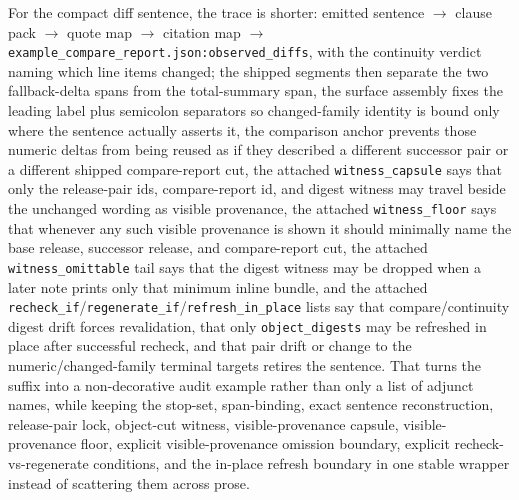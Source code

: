 \documentclass[11pt]{article}
\begin{document}
For the compact diff sentence, the trace is shorter: emitted sentence $\to$ clause pack $\to$ quote map $\to$ citation map $\to$ \texttt{example\_compare\_report.json:observed\_diffs}, with the continuity verdict naming which line items changed; the shipped segments then separate the two fallback-delta spans from the total-summary span, the surface assembly fixes the leading label plus semicolon separators so changed-family identity is bound only where the sentence actually asserts it, the comparison anchor prevents those numeric deltas from being reused as if they described a different successor pair or a different shipped compare-report cut, the attached \texttt{witness\_capsule} says that only the release-pair ids, compare-report id, and digest witness may travel beside the unchanged wording as visible provenance, the attached \texttt{witness\_floor} says that whenever any such visible provenance is shown it should minimally name the base release, successor release, and compare-report cut, the attached \texttt{witness\_omittable} tail says that the digest witness may be dropped when a later note prints only that minimum inline bundle, and the attached \texttt{recheck\_if}/\texttt{regenerate\_if}/\texttt{refresh\_in\_place} lists say that compare/continuity digest drift forces revalidation, that only \texttt{object\_digests} may be refreshed in place after successful recheck, and that pair drift or change to the numeric/changed-family terminal targets retires the sentence.
That turns the suffix into a non-decorative audit example rather than only a list of adjunct names, while keeping the stop-set, span-binding, exact sentence reconstruction, release-pair lock, object-cut witness, visible-provenance capsule, visible-provenance floor, explicit visible-provenance omission boundary, explicit recheck-vs-regenerate conditions, and the in-place refresh boundary in one stable wrapper instead of scattering them across prose.
\end{document}
